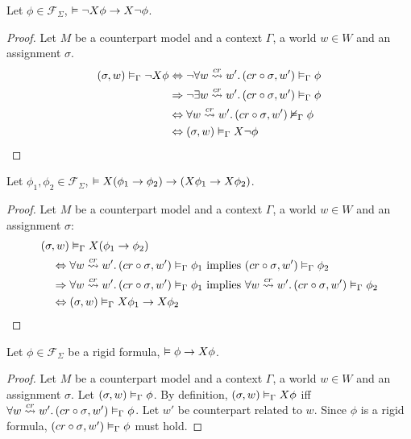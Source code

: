 \begin{lemma}\label{lem:negnextdist}
  Let $\phi \in \mathcal{F}_\Sigma$, $\vDash \neg X{\phi} \to X{\neg\phi}$.
\end{lemma}
\begin{proof}
  Let $M$ be a counterpart model and a context $\Gamma$, a world $w \in W$ and an assignment $\sigma$.
  \[
    \begin{split}
      ({\sigma}, {w}) \vDash_{\Gamma} {\neg X{\phi}}
        &\Leftrightarrow \neg\forall {w \overset{cr}{\rightsquigarrow} w'} \ldotp {({cr \circ \sigma}, {w'}) \vDash_{\Gamma} {\phi}} \\
        &\Rightarrow \neg\exists {w \overset{cr}{\rightsquigarrow} w'} \ldotp {({cr \circ \sigma}, {w'}) \vDash_{\Gamma} {\phi}} \\
        &\Leftrightarrow \forall {w \overset{cr}{\rightsquigarrow} w'} \ldotp {({cr \circ \sigma}, {w'}) \nvDash_{\Gamma} {\phi}} \\
        &\Leftrightarrow ({\sigma}, {w}) \vDash_{\Gamma} {X{\neg\phi}}
    \end{split}
  \]
\end{proof}

\begin{lemma}\label{lem:impnextdist}
  Let $\phi_1, \phi_2 \in \mathcal{F}_\Sigma$, $\vDash X{(\phi_1 \to \phi_2)} \to (X{\phi_1} \to
  X{\phi_2})$.
\end{lemma}
\begin{proof}
  Let $M$ be a counterpart model and a context $\Gamma$, a world $w \in W$ and an assignment $\sigma$:
  \[
    \begin{split}
      &({\sigma}, {w}) \vDash_{\Gamma} {X{(\phi_1 \to \phi_2)}} \\
        &\quad\Leftrightarrow \forall {w \overset{cr}{\rightsquigarrow} w'} \ldotp {({cr \circ \sigma}, {w'}) \vDash_{\Gamma} {\phi_1} \text{ implies }
            ({cr \circ \sigma}, {w'}) \vDash_{\Gamma} {\phi_2}} \\
        &\quad\Rightarrow \forall {w \overset{cr}{\rightsquigarrow} w'} \ldotp {({cr \circ \sigma}, {w'}) \vDash_{\Gamma} {\phi_1}} \text{ implies }
            \forall {w \overset{cr}{\rightsquigarrow} w'} \ldotp {({cr \circ \sigma}, {w'}) \vDash_{\Gamma} {\phi_2}} \\
        &\quad\Leftrightarrow ({\sigma}, {w}) \vDash_{\Gamma} {X{\phi_1} \to X{\phi_2}}
    \end{split}
  \]
\end{proof}

\begin{lemma}\label{lem:nextintro}
  Let $\phi \in \mathcal{F}_\Sigma$ be a rigid formula, $\vDash \phi \to X{\phi}$.
\end{lemma}
\begin{proof}
  Let $M$ be a counterpart model and a context $\Gamma$, a world $w \in W$ and an assignment $\sigma$.
  Let $({\sigma}, {w}) \vDash_{\Gamma} {\phi}$. By definition, $({\sigma}, {w}) \vDash_{\Gamma} {X{\phi}}$ iff
  $\forall {w \overset{cr}{\rightsquigarrow} w'} \ldotp {({cr \circ \sigma}, {w'}) \vDash_{\Gamma} {\phi}}$. Let $w'$ be counterpart related to $w$.
  Since $\phi$ is a rigid formula, $({cr \circ \sigma}, {w'}) \vDash_{\Gamma} {\phi}$ must hold.
\end{proof}

